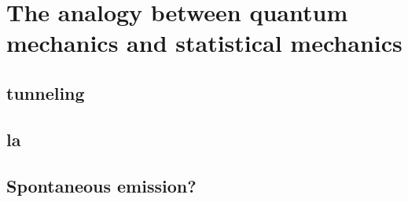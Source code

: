 


\section{The analogy between quantum mechanics and statistical mechanics}

\subsection{tunneling}

\subsection{la}

\subsection{Spontaneous emission?}


